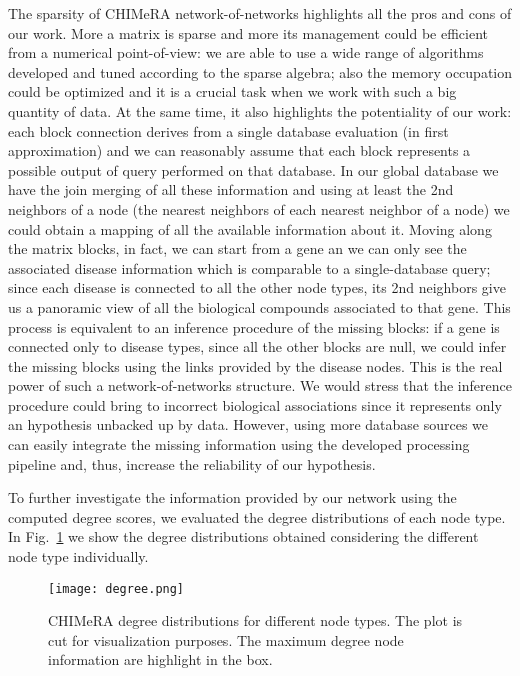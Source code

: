 \documentclass{standalone}
\begin{document}
The sparsity of \textsf{CHIMeRA} network-of-networks highlights all the pros and cons of our work.
More a matrix is sparse and more its management could be efficient from a numerical point-of-view: we are able to use a wide range of algorithms developed and tuned according to the sparse algebra; also the memory occupation could be optimized and it is a crucial task when we work with such a big quantity of data.
At the same time, it also highlights the potentiality of our work: each block connection derives from a single database evaluation (in first approximation) and we can reasonably assume that each block represents a possible output of query performed on that database.
In our global database we have the join merging of all these information and using at least the 2nd neighbors of a node (the nearest neighbors of each nearest neighbor of a node) we could obtain a mapping of all the available information about it.
Moving along the matrix blocks, in fact, we can start from a gene an we can only see the associated disease information which is comparable to a single-database query; since each disease is connected to all the other node types, its 2nd neighbors give us a panoramic view of all the biological compounds associated to that gene.
This process is equivalent to an inference procedure of the missing blocks: if a gene is connected only to disease types, since all the other blocks are null, we could infer the missing blocks using the links provided by the disease nodes.
This is the real power of such a network-of-networks structure.
We would stress that the inference procedure could bring to incorrect biological associations since it represents only an hypothesis unbacked up by data.
However, using more database sources we can easily integrate the missing information using the developed processing pipeline and, thus, increase the reliability of our hypothesis.

To further investigate the information provided by our network using the computed degree scores, we evaluated the degree distributions of each node type.
In Fig.~\ref{fig:chimera_degree} we show the degree distributions obtained considering the different node type individually.

\begin{figure}[htbp]
\centering
\texttt{[image: degree.png]}
\caption{CHIMeRA degree distributions for different node types.
The plot is cut for visualization purposes.
The maximum degree node information are highlight in the box.
}
\label{fig:chimera_degree}
\end{figure}
\end{document}
